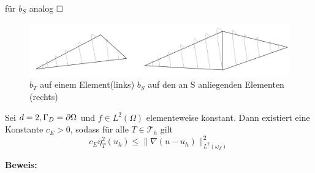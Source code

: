 für $b_S$ analog
$\hfill \Box$
\begin{figure}[!htbp]
	\begin{center}
		\includegraphics[width=16cm]{pics/bubble.png}
	\end{center}
	\caption{$b_T$ auf einem Element(links) $b_S$ auf den an S anliegenden Elementen (rechts)}
\end{figure}

\begin{theorem}
	Sei $d=2, \Gamma_D = \partial \Omega$ und $f\in L^2(\Omega)$ elementeweise konstant. Dann existiert eine Konstante $c_E > 0$, sodass für alle $T\in\mathscr{T}_h$ gilt
	\[
		c_E \eta_T^2(u_h)\leq \|\nabla (u-u_h)\|^2_{L^2(\omega_T)}
	\] 
\end{theorem}
\textbf{Beweis:}
